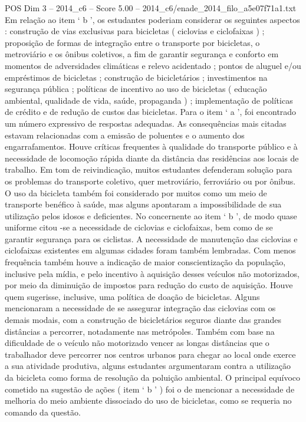 \begin{textsample}{POS Dim 3 – 2014\_c6 – Score 5.00 – 2014\_c6/enade\_2014\_filo\_a5e07f71a1.txt}
Em relação ao item ‘ b ’, os estudantes poderiam considerar os seguintes aspectos : construção de vias exclusivas para bicicletas ( ciclovias e ciclofaixas ) ; proposição de formas de integração entre o transporte por bicicletas, o metroviário e os ônibus coletivos, a fim de garantir segurança e conforto em momentos de adversidades climáticas e relevo acidentado ; pontos de aluguel e/ou empréstimos de bicicletas ; construção de bicicletários ; investimentos na segurança pública ; políticas de incentivo ao uso de bicicletas ( educação ambiental, qualidade de vida, saúde, propaganda ) ; implementação de políticas de crédito e de redução de custos das bicicletas.
Para o item ‘ a ’, foi encontrado um número expressivo de respostas adequadas.
As consequências mais citadas estavam relacionadas com a emissão de poluentes e o aumento dos engarrafamentos.
Houve críticas frequentes à qualidade do transporte público e à necessidade de locomoção rápida diante da distância das residências aos locais de trabalho.
Em tom de reivindicação, muitos estudantes defenderam solução para os problemas do transporte coletivo, quer metroviário, ferroviário ou por ônibus.
O uso da bicicleta também foi considerado por muitos como um meio de transporte benéfico à saúde, mas alguns apontaram a impossibilidade de sua utilização pelos idosos e deficientes.
No concernente ao item ‘ b ’, de modo quase uniforme citou -se a necessidade de ciclovias e ciclofaixas, bem como de se garantir segurança para os ciclistas.
A necessidade de manutenção das ciclovias e ciclofaixas existentes em algumas cidades foram também lembradas.
Com menos frequência também houve a indicação de maior conscientização da população, inclusive pela mídia, e pelo incentivo à aquisição desses veículos não motorizados, por meio da diminuição de impostos para redução do custo de aquisição.
Houve quem sugerisse, inclusive, uma política de doação de bicicletas.
Alguns mencionaram a necessidade de se assegurar integração das ciclovias com os demais modais, com a construção de bicicletários seguros diante das grandes distâncias a percorrer, notadamente nas metrópoles.
Também com base na dificuldade de o veículo não motorizado vencer as longas distâncias que o trabalhador deve percorrer nos centros urbanos para chegar ao local onde exerce a sua atividade produtiva, alguns estudantes argumentaram contra a utilização da bicicleta como forma de resolução da poluição ambiental.
O principal equívoco cometido na sugestão de ações ( item ‘ b ’ ) foi o de mencionar a necessidade de melhoria do meio ambiente dissociado do uso de bicicletas, como se requeria no comando da questão.

\end{textsample}
